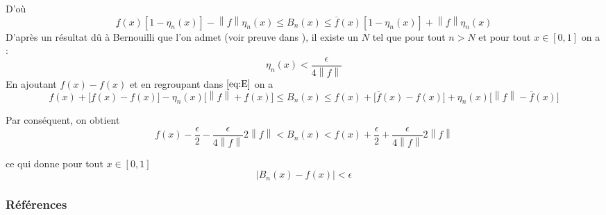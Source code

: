 \documentclass[
	10pt, %
	xcolor={svgnames}
]{beamer}
\begin{document}
\begin{frame}
	D'où 
	\begin{equation}
		\underline{f}(x)[1 - \eta_n(x)] - {\left\lVert f \right\rVert} \eta_n(x)
		\leq B_n(x) \leq \overline{f}(x)[1-\eta_n(x)] + {\left\lVert f \right\rVert} \eta_n(x) \label{eq:E}
	\end{equation}
	D'après un résultat dû à Bernouilli que l'on admet (voir preuve dans \cite{pinkus2000approximation}), il existe un \( N \) tel que pour tout \( n > N \) et pour tout \( x \in [0,1] \) on a :
	\begin{equation}
		\eta_n(x) < \frac{\epsilon}{4 {\left\lVert f \right\rVert}} \label{eq:B}
	\end{equation}
	En ajoutant \( f(x) - f(x) \) et en regroupant dans \( \eqref{eq:E} \) on a
	{\footnotesize
	\begin{equation*}
	f(x) + \lbrack \underline{f}(x)-f(x)\rbrack - 
		\eta_n(x) \lbrack {\left\lVert f \right\rVert} + \underline{f}(x)\rbrack 
		\leq B_n(x) \leq f(x) + \lbrack \overline{f}(x) - f(x) \rbrack 
	+ \eta_n(x) \lbrack {\left\lVert f \right\rVert}-\overline{f}(x) \rbrack
	\end{equation*}}

	Par conséquent, on obtient
	\begin{equation*}
		f(x)-\frac{\epsilon}{2} - 
		\frac{\epsilon}{4 {\left\lVert f \right\rVert}} 2{\left\lVert f \right\rVert}
		< B_n(x) < f(x) + \frac{\epsilon}{2}+\frac{\epsilon}{4 {\left\lVert f \right\rVert}} 2{\left\lVert f \right\rVert}
	\end{equation*}

	ce qui donne pour tout \( x \in [0,1] \)
	\begin{equation*}
		{\left\lvert B_n(x) - f(x) \right\rvert} < \epsilon
	\end{equation*}
	\end{frame}
\begin{frame} %
	\frametitle{Références}
	
	\printbibliography

\end{frame}
\end{document}
